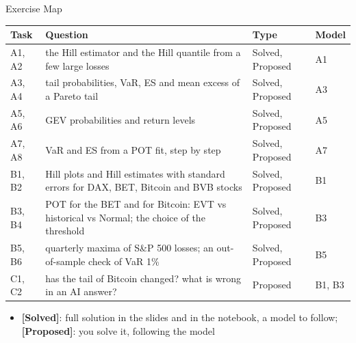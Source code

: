 \begin{frame}{Exercise Map}
\itemsize{\small}
\begin{center}
\footnotesize
\begin{tabular}{>{\raggedright\arraybackslash}p{1.1cm}>{\raggedright\arraybackslash}p{7.5cm}>{\raggedright\arraybackslash}p{1.9cm}>{\raggedright\arraybackslash}p{1.4cm}}
\toprule
\textbf{Task} & \textbf{Question} & \textbf{Type} & \textbf{Model} \\
\midrule
A1, A2 & the Hill estimator and the Hill quantile from a few large losses & Solved, Proposed & A1 \\
A3, A4 & tail probabilities, VaR, ES and mean excess of a Pareto tail & Solved, Proposed & A3 \\
A5, A6 & GEV probabilities and return levels & Solved, Proposed & A5 \\
A7, A8 & VaR and ES from a POT fit, step by step & Solved, Proposed & A7 \\
B1, B2 & Hill plots and Hill estimates with standard errors for DAX, BET, Bitcoin and BVB stocks & Solved, Proposed & B1 \\
B3, B4 & POT for the BET and for Bitcoin: EVT vs historical vs Normal; the choice of the threshold & Solved, Proposed & B3 \\
B5, B6 & quarterly maxima of S\&P 500 losses; an out-of-sample check of VaR 1\% & Solved, Proposed & B5 \\
C1, C2 & has the tail of Bitcoin changed? what is wrong in an AI answer? & Proposed & B1, B3 \\
\bottomrule
\end{tabular}
\end{center}
\begin{itemize}
    \item \textbf{[Solved]}: full solution in the slides and in the notebook, a model to follow; \textbf{[Proposed]}: you solve it, following the model
\end{itemize}
\end{frame}

